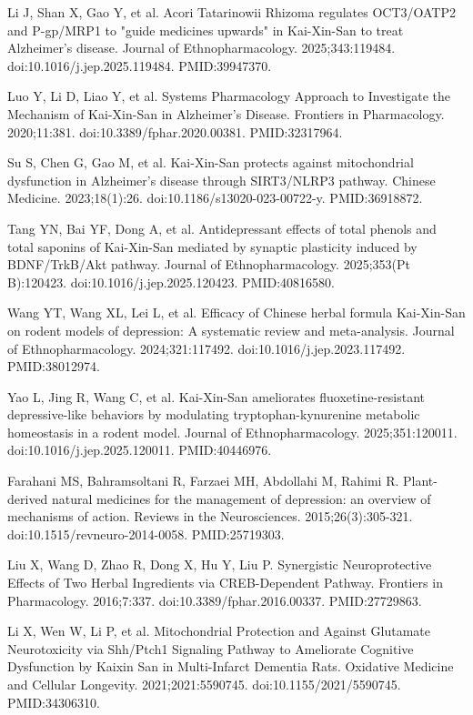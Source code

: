 \documentclass[12pt,oneside]{book}
\newcommand{\reff}[2]{\par\hangindent=7mm\hangafter=1\noindent[#1]\hspace{2mm}#2\par}
\begin{document}
\reff{49}{Li J, Shan X, Gao Y, et al. Acori Tatarinowii Rhizoma regulates OCT3/OATP2 and P-gp/MRP1 to "guide medicines upwards" in Kai-Xin-San to treat Alzheimer's disease. Journal of Ethnopharmacology. 2025;343:119484. doi:10.1016/j.jep.2025.119484. PMID:39947370.}

\reff{50}{Luo Y, Li D, Liao Y, et al. Systems Pharmacology Approach to Investigate the Mechanism of Kai-Xin-San in Alzheimer's Disease. Frontiers in Pharmacology. 2020;11:381. doi:10.3389/fphar.2020.00381. PMID:32317964.}

\reff{51}{Su S, Chen G, Gao M, et al. Kai-Xin-San protects against mitochondrial dysfunction in Alzheimer's disease through SIRT3/NLRP3 pathway. Chinese Medicine. 2023;18(1):26. doi:10.1186/s13020-023-00722-y. PMID:36918872.}

\reff{52}{Tang YN, Bai YF, Dong A, et al. Antidepressant effects of total phenols and total saponins of Kai-Xin-San mediated by synaptic plasticity induced by BDNF/TrkB/Akt pathway. Journal of Ethnopharmacology. 2025;353(Pt B):120423. doi:10.1016/j.jep.2025.120423. PMID:40816580.}

\reff{53}{Wang YT, Wang XL, Lei L, et al. Efficacy of Chinese herbal formula Kai-Xin-San on rodent models of depression: A systematic review and meta-analysis. Journal of Ethnopharmacology. 2024;321:117492. doi:10.1016/j.jep.2023.117492. PMID:38012974.}

\reff{54}{Yao L, Jing R, Wang C, et al. Kai-Xin-San ameliorates fluoxetine-resistant depressive-like behaviors by modulating tryptophan-kynurenine metabolic homeostasis in a rodent model. Journal of Ethnopharmacology. 2025;351:120011. doi:10.1016/j.jep.2025.120011. PMID:40446976.}

\reff{55}{Farahani MS, Bahramsoltani R, Farzaei MH, Abdollahi M, Rahimi R. Plant-derived natural medicines for the management of depression: an overview of mechanisms of action. Reviews in the Neurosciences. 2015;26(3):305-321. doi:10.1515/revneuro-2014-0058. PMID:25719303.}

\reff{56}{Liu X, Wang D, Zhao R, Dong X, Hu Y, Liu P. Synergistic Neuroprotective Effects of Two Herbal Ingredients via CREB-Dependent Pathway. Frontiers in Pharmacology. 2016;7:337. doi:10.3389/fphar.2016.00337. PMID:27729863.}

\reff{57}{Li X, Wen W, Li P, et al. Mitochondrial Protection and Against Glutamate Neurotoxicity via Shh/Ptch1 Signaling Pathway to Ameliorate Cognitive Dysfunction by Kaixin San in Multi-Infarct Dementia Rats. Oxidative Medicine and Cellular Longevity. 2021;2021:5590745. doi:10.1155/2021/5590745. PMID:34306310.}
\end{document}
